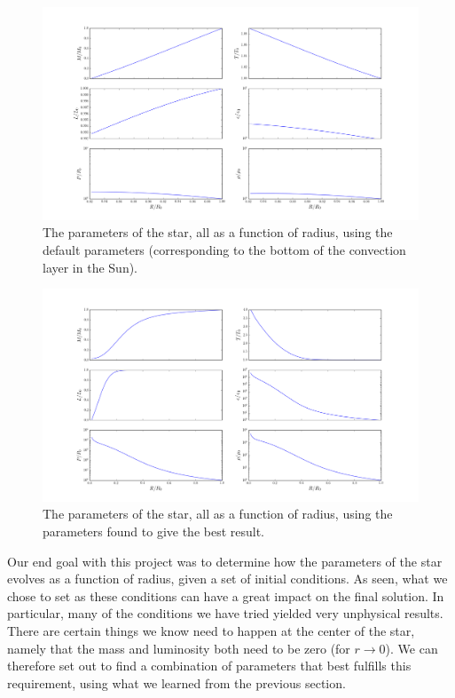 \documentclass[11pt,twocolumn]{article}
\begin{document}
\begin{figure}
  \centering
  \includegraphics[scale=0.5]{fig/default-param.png}
  \caption{\label{fig:default-param} The parameters of the star, all as a
  function of radius, using the default parameters (corresponding to
  the bottom of the convection layer in the Sun).}
\end{figure}

\begin{figure}
  \centering
  \includegraphics[scale=0.5]{fig/best-param.png}
  \caption{\label{fig:best-param} The parameters of the star, all as a
  function of radius, using the parameters found to give the best result.}
\end{figure}


Our end goal with this project was to determine how the parameters of
the star evolves as a function of radius, given a set of initial
conditions. As seen, what we chose to set as these conditions can have
a great impact on the final solution. In particular, many of the
conditions we have tried yielded very unphysical results. There are
certain things we know need to happen at the center of the star,
namely that the mass and luminosity both need to be zero (for
$r\rightarrow 0$). We can therefore set out to find a combination of
parameters that best fulfills this requirement, using what we learned
from the previous section. 
\end{document}
